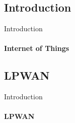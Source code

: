 \subsection{Introduction}

\begin{frame}{Introduction}
\framesubtitle{Internet of Things}
\begin{center}
\end{center}
\end{frame}

\subsection{LPWAN}

\begin{frame}{Introduction}
\framesubtitle{LPWAN}

\end{frame}

